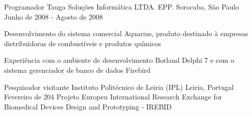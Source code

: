 \begin{cventries}
    \cventry
    {Programador}
    {Tauga Soluções Informática LTDA. EPP.}
    {Sorocaba, São Paulo}
    {Junho de 2008 - Agosto de 2008}
    {
      \begin{cvitems}
      \item{Desenvolvimento do sistema comercial Aquarius, produto destinado à empresas distribuidoras de combustíveis e produtos químicos}
      \item {Experiência com o ambiente de desenvolvimento Borland Delphi 7 e com o sistema gerenciador de banco de dados Firebird}
      \end{cvitems}
    }

  \end{cventries}


\begin{cventries}

  \cventry
    {Pesquisador visitante}
    {Instituto Politécnico de Leiria (IPL)}
    {Leiria, Portugal}
    {Fevereiro de 204}
    {Projeto Europeu International Research Exchange for Biomedical Devices Design and Prototyping - IREBID}
  \end{cventries}
